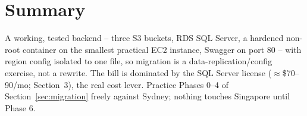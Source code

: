 \documentclass[10pt]{article}
\begin{document}
\section{Summary}
A working, tested backend -- three S3 buckets, RDS SQL Server, a hardened
non-root container on the smallest practical EC2 instance, Swagger on port
80 -- with region config isolated to one file, so migration is a
data-replication/config exercise, not a rewrite. The bill is dominated by
the SQL Server license ($\approx$\$70--90/mo; Section~3), the real cost
lever. Practice Phases 0--4 of Section~\ref{sec:migration} freely against
Sydney; nothing touches Singapore until Phase 6.
\end{document}

